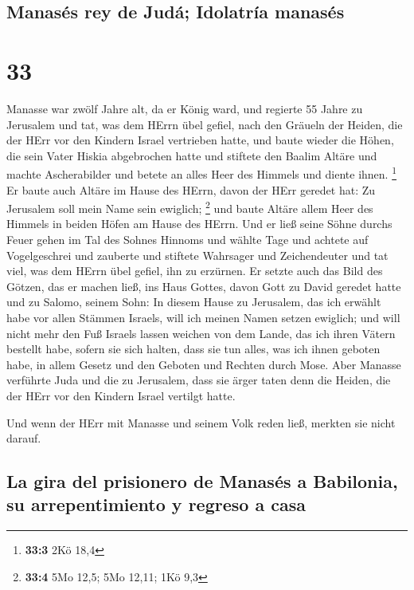 \hypertarget{manasuxe9s-rey-de-juduxe1-idolatruxeda-manasuxe9s}{%
\subsection{Manasés rey de Judá; Idolatría
manasés}\label{manasuxe9s-rey-de-juduxe1-idolatruxeda-manasuxe9s}}

\hypertarget{section-32}{%
\section{33}\label{section-32}}

 Manasse war zwölf Jahre alt, da er König ward, und
regierte 55 Jahre zu Jerusalem  und tat, was dem HErrn
übel gefiel, nach den Gräueln der Heiden, die der HErr vor den Kindern
Israel vertrieben hatte,  und baute wieder die Höhen, die
sein Vater Hiskia abgebrochen hatte und stiftete den Baalim Altäre und
machte Ascherabilder und betete an alles Heer des Himmels und diente
ihnen. \footnote{\textbf{33:3} 2Kö 18,4}  Er baute auch
Altäre im Hause des HErrn, davon der HErr geredet hat: Zu Jerusalem soll
mein Name sein ewiglich; \footnote{\textbf{33:4} 5Mo 12,5; 5Mo 12,11;
  1Kö 9,3}  und baute Altäre allem Heer des Himmels in
beiden Höfen am Hause des HErrn.  Und er ließ seine Söhne
durchs Feuer gehen im Tal des Sohnes Hinnoms und wählte Tage und achtete
auf Vogelgeschrei und zauberte und stiftete Wahrsager und Zeichendeuter
und tat viel, was dem HErrn übel gefiel, ihn zu erzürnen. 
Er setzte auch das Bild des Götzen, das er machen ließ, ins Haus Gottes,
davon Gott zu David geredet hatte und zu Salomo, seinem Sohn: In diesem
Hause zu Jerusalem, das ich erwählt habe vor allen Stämmen Israels, will
ich meinen Namen setzen ewiglich;  und will nicht mehr den
Fuß Israels lassen weichen von dem Lande, das ich ihren Vätern bestellt
habe, sofern sie sich halten, dass sie tun alles, was ich ihnen geboten
habe, in allem Gesetz und den Geboten und Rechten durch Mose.
 Aber Manasse verführte Juda und die zu Jerusalem, dass
sie ärger taten denn die Heiden, die der HErr vor den Kindern Israel
vertilgt hatte.

 Und wenn der HErr mit Manasse und seinem Volk reden
ließ, merkten sie nicht darauf.

\hypertarget{la-gira-del-prisionero-de-manasuxe9s-a-babilonia-su-arrepentimiento-y-regreso-a-casa}{%
\subsection{La gira del prisionero de Manasés a Babilonia, su
arrepentimiento y regreso a
casa}\label{la-gira-del-prisionero-de-manasuxe9s-a-babilonia-su-arrepentimiento-y-regreso-a-casa}}

